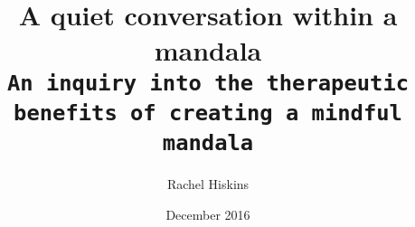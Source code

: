 \documentclass{book}
\author{Rachel Hiskins}
\title{{\Huge A quiet conversation within a mandala}\\[15pt]
\space
\texttt{An inquiry into the therapeutic \\benefits of creating a mindful mandala}}
\date {December 2016}
\begin{document}
\begin{titlepage}
	\calligra
    \maketitle
\end{titlepage}
\doublespacing 

	




	
	
	
	

	
	
	
	




\end{document}
